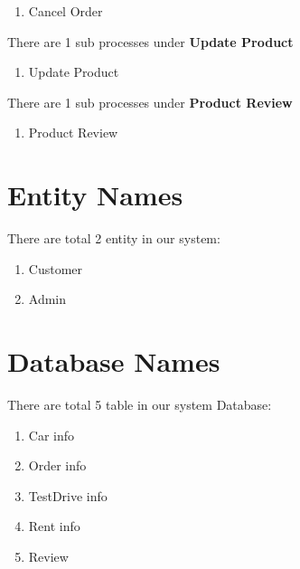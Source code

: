 \begin{enumerate}
\item  Cancel Order

\end{enumerate}

\noindent 

\noindent There are 1 sub processes under \textbf{Update Product}

\begin{enumerate}
\item  Update Product

\end{enumerate}

\noindent 

\noindent There are 1 sub processes under \textbf{Product Review}

\begin{enumerate}
\item  Product Review

\end{enumerate}

\noindent 





\section{Entity Names}

\noindent There are total 2 entity in our system:

\begin{enumerate}
\item  Customer

\item  Admin
\end{enumerate}

\noindent 
\section{Database Names}

\noindent There are total 5 table in our system Database:

\begin{enumerate}
\item  Car info

\item  Order info

\item  TestDrive info

\item  Rent info

\item  Review


\end{enumerate}



